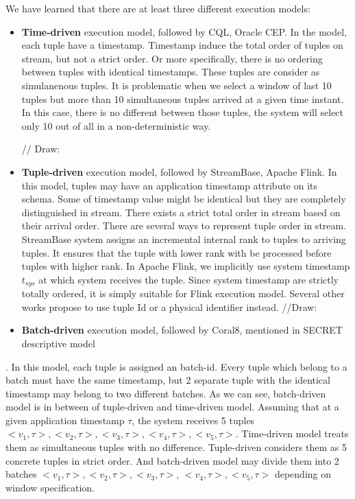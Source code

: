 We have learned that there are at least three different execution models:
\begin{itemize}
	\item \textbf{Time-driven} execution model, followed by CQL, Oracle CEP. In the model, each tuple have a timestamp. Timestamp induce the total order of tuples on stream, but not a strict order. Or more specifically, there is no ordering between tuples with identical timestamps. These tuples are consider as simulanenous tuples. It is problematic when we select a window of last 10 tuples but more than 10 simultaneous tuples arrived at a given time instant. In this case, there is no different between those tuples, the system will select only 10 out of all in a non-deterministic way.
	
	// Draw:
	
	\item \textbf{Tuple-driven} execution model, followed by StreamBase, Apache Flink. In this model, tuples may have an application timestamp attribute on its schema. Some of timestamp value might be identical but they are completely distinguished in stream. There exists a strict total order in stream based on their arrival order. There are several ways to represent tuple order in stream. StreamBase system assigns an incremental internal rank to tuples to arriving tuples. It ensures that the tuple with lower rank with be processed before tuples with higher rank. In Apache Flink, we implicitly use system timestamp   $t_{sys}$ at which system receives the tuple. Since system timestamp are strictly totally ordered, it is simply suitable for Flink execution model. Several other works propose to use tuple Id\citep{Dinda:2013} or a physical identifier\citep{Petit:2010} instead. 
	//Draw: 
	
	\item \textbf{Batch-driven} execution model, followed by Coral8, mentioned in SECRET\citep{Botan:2010} descriptive model
\end{itemize}. In this model, each tuple is assigned an batch-id. Every tuple which belong to a batch must have the same timestamp, but 2 separate tuple with the identical timestamp may belong to two different batches. As we can see, batch-driven model is in between of tuple-driven and time-driven model. Assuming that at a given application timestamp $\tau$, the system receives 5 tuples ${<v_1,\tau>,<v_2,\tau>,<v_3,\tau>,<v_4,\tau>,<v_5,\tau>}$. Time-driven model treats them as simultaneous tuples with no difference. Tuple-driven considers them as 5 concrete tuples in strict order. And batch-driven model may divide them into 2 batches ${<v_1,\tau>,<v_2,\tau>,<v_3,\tau>}$, ${<v_4,\tau>,<v_5,\tau>}$ depending on window specification.


